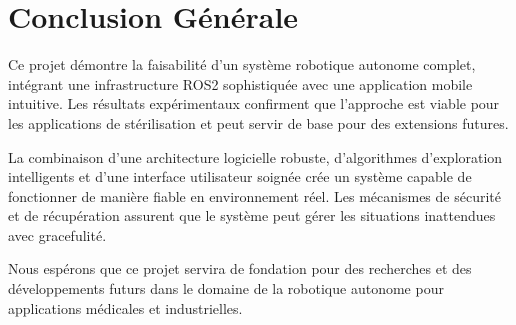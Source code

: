 \documentclass[12pt,a4paper,oneside]{report}
\begin{document}
\section{Conclusion Générale}

Ce projet démontre la faisabilité d'un système robotique autonome complet, intégrant une infrastructure ROS2 sophistiquée avec une application mobile intuitive. Les résultats expérimentaux confirment que l'approche est viable pour les applications de stérilisation et peut servir de base pour des extensions futures.

La combinaison d'une architecture logicielle robuste, d'algorithmes d'exploration intelligents et d'une interface utilisateur soignée crée un système capable de fonctionner de manière fiable en environnement réel. Les mécanismes de sécurité et de récupération assurent que le système peut gérer les situations inattendues avec gracefulité.

Nous espérons que ce projet servira de fondation pour des recherches et des développements futurs dans le domaine de la robotique autonome pour applications médicales et industrielles.

\newpage
\end{document}
